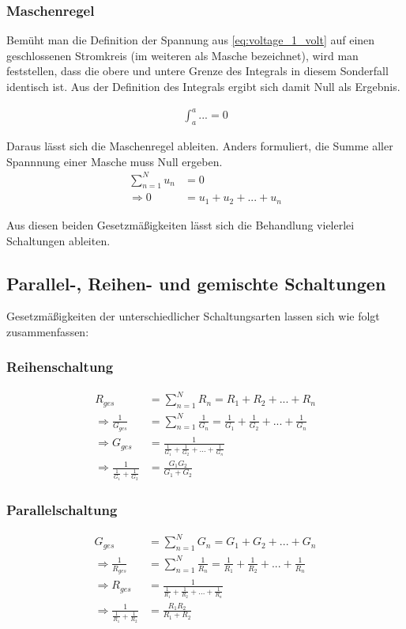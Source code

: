 \documentclass[12pt,a4paper]{article}%
\numberwithin{equation}{section}
\begin{document}
\subsubsection{Maschenregel} \label{sec:kirch_2}
Bemüht man die Definition der Spannung aus \eqref{eq:voltage_1_volt} auf einen geschlossenen Stromkreis (im weiteren als Masche bezeichnet), wird man feststellen, dass die obere und untere Grenze des Integrals in diesem Sonderfall identisch ist. Aus der Definition des Integrals ergibt sich damit Null als Ergebnis.

\begin{align*}
\int_a^a ... = 0
\end{align*}

Daraus lässt sich die Maschenregel ableiten. Anders formuliert, die Summe aller Spannnung einer Masche muss Null ergeben.
\begin{align}
\sum_{n=1}^N u_n &= 0 \\ \nonumber
\Rightarrow 0 &= u_1 + u_2 + ... + u_n
\end{align}

Aus diesen beiden Gesetzmäßigkeiten lässt sich die Behandlung vielerlei Schaltungen ableiten. 


\subsection{Parallel-, Reihen- und gemischte Schaltungen}

Gesetzmäßigkeiten der unterschiedlicher Schaltungsarten lassen sich wie folgt zusammenfassen:
\subsubsection{Reihenschaltung}
\begin{align}
R_{ges} &= \sum_{n = 1}^N R_n = R_1 + R_2 + ... + R_n \\
\Rightarrow \frac{1}{G_{ges}} &= \sum_{n = 1}^N \frac{1}{G_n} = \frac{1}{G_1} + \frac{1}{G_2} + ... + \frac{1}{G_n} \\
\Rightarrow G_{ges} &= \frac{1}{\frac{1}{G_1} + \frac{1}{G_2} + ... + \frac{1}{G_n}} \nonumber \\
\Rightarrow \frac{1}{\frac{1}{G_1} + \frac{1}{G_2}} &= \frac{G_1 G_2}{G_1 + G_2} \nonumber
\end{align}

\subsubsection{Parallelschaltung}
\begin{align}
G_{ges} &= \sum_{n = 1}^N G_n = G_1 + G_2 + ... + G_n \\
\Rightarrow \frac{1}{R_{ges}} &= \sum_{n = 1}^N \frac{1}{R_n} = \frac{1}{R_1} + \frac{1}{R_2} + ... + \frac{1}{R_n} \\
\Rightarrow R_{ges} &= \frac{1}{\frac{1}{R_1} + \frac{1}{R_2} + ... + \frac{1}{R_n}} \nonumber \\
\Rightarrow \frac{1}{\frac{1}{R_1} + \frac{1}{R_2}} &= \frac{R_1 R_2}{R_1 + R_2} \nonumber
\end{align}
\end{document}
